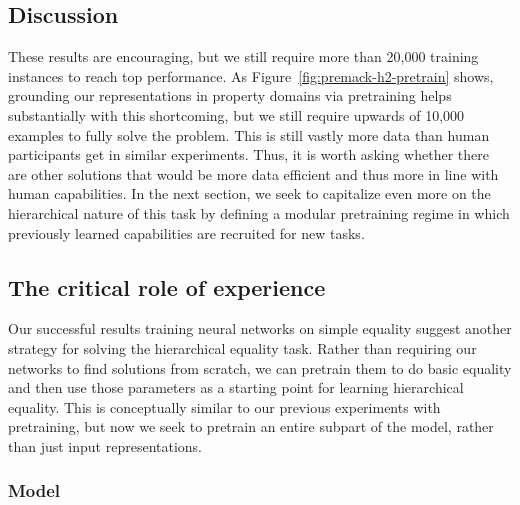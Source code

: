 \documentclass[9pt,twocolumn,twoside,lineno]{pnas-new}
\newcommand{\figref}[1]{Figure~\ref{#1}}
\newcommand{\update}[1]{{\color{darkblue}#1}}
\begin{document}
\subsection*{Discussion}

These results are encouraging, but we still require more than 20,000 training instances to reach top performance. \update{As \figref{fig:premack-h2-pretrain} shows, grounding our representations in property domains via pretraining helps substantially with this shortcoming, but we still require upwards of 10,000 examples to fully solve the problem. This is still vastly more data than human participants get in similar experiments.}  Thus, it is worth asking whether there are other solutions that would be more data efficient and thus more in line with human capabilities.  In the next section, we seek to capitalize even more on the hierarchical nature of this task by defining a modular pretraining regime in which previously learned capabilities are recruited for new tasks.


\subsection*{The critical role of experience}\label{sec:modular}

Our successful results training neural networks on simple equality suggest another strategy for solving the hierarchical equality task. Rather than requiring our networks to find solutions from scratch, we can pretrain them to do basic equality and then use those parameters as a starting point for learning hierarchical equality. \update{This is conceptually similar to our previous experiments with pretraining, but now we seek to pretrain an entire subpart of the model, rather than just input representations.}


\subsubsection*{Model}
\end{document}
